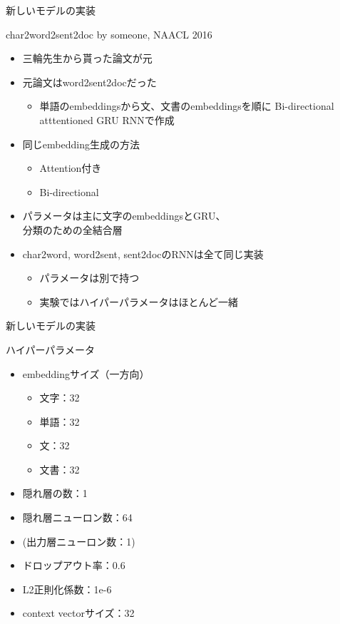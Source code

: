 \documentclass[aspectratio=43,unicode,10pt]{beamer}
\begin{document}
\begin{frame}{新しいモデルの実装}
  \begin{block}{char2word2sent2doc by someone, NAACL 2016}
    \begin{itemize}
      \item 三輪先生から貰った論文が元
      \item 元論文はword2sent2docだった
        \begin{itemize}
          \item 単語のembeddingsから文、文書のembeddingsを順に
                Bi-directional atttentioned GRU RNNで作成
        \end{itemize}
      \item 同じembedding生成の方法
        \begin{itemize}
          \item Attention付き
          \item Bi-directional
        \end{itemize}
      \item パラメータは主に文字のembeddingsとGRU、\\分類のための全結合層
      \item char2word, word2sent, sent2docのRNNは全て同じ実装
        \begin{itemize}
          \item パラメータは別で持つ
          \item 実験ではハイパーパラメータはほとんど一緒
        \end{itemize}
    \end{itemize}
  \end{block}
\end{frame}

\begin{frame}{新しいモデルの実装}
  \begin{block}{ハイパーパラメータ}
    \begin{itemize}
      \item embeddingサイズ（一方向）
        \begin{itemize}
          \item 文字：32
          \item 単語：32
          \item 文：32
          \item 文書：32
        \end{itemize}
      \item 隠れ層の数：1
      \item 隠れ層ニューロン数：64
      \item (出力層ニューロン数：1)
      \item ドロップアウト率：0.6
      \item L2正則化係数：1e-6
      \item context vectorサイズ：32
    \end{itemize}
  \end{block}
\end{frame}
\end{document}
